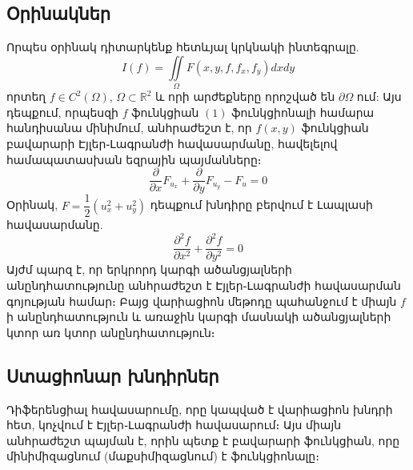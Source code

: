 \documentclass[fleqn, bachelor,subf,12pt,notitlepage]{article}
\begin{document}
\subsection*{Օրինակներ}
\hspace{\parindent}Որպես օրինակ դիտարկենք հետևյալ կրկնակի ինտեգրալը.
\begin{equation}
I\left(f\right)=\iint \limits_{\Omega} F\left(x, y, f, f_{x}, f_{y}\right)dxdy
\end{equation}
որտեղ $f \in C^{2}(\Omega)$,  $\Omega\subset \mathbb{R}^{2}$ և որի արժեքները որոշված են $\partial \Omega$ ում:
Այս դեպքում, որպեսզի $f$ ֆունկցիան $\left(1\right)$ ֆունկցիոնալի համարա հանդիսանա մինիմում, անհրաժեշտ է, որ $f(x,y)$ ֆունկցիան բավարարի Էյլեր֊Լագրանժի հավասարմանը, հավելելով համապատասխան եզրային պայմանները։
\begin{equation}
\dfrac{\partial}{\partial x}F_{u_{x}} + \dfrac{\partial}{\partial y}F_{u_{y}} - F_{u} = 0
\end{equation}
Օրինակ, $F = \dfrac{1}{2}\left(u_{x}^2+u_{y}^2\right)$ դեպքում խնդիրը բերվում է Լապլասի հավասարմանը.
\begin{equation}
\dfrac{\partial^{2}f}{\partial x^{2}} + \dfrac{\partial^{2}f}{\partial y^{2}} = 0
\end{equation}
Այժմ պարզ է, որ երկրորդ կարգի ածանցյալների անընդհատությունը անհրաժեշտ է Էյլեր֊Լագրանժի հավասարման գոյության համար։ Բայց վարիացիոն մեթոդը պահանջում է միայն $f$ ի անընդհատություն և առաջին կարգի մասնակի ածանցյալների կտոր առ կտոր անընդհատություն։
\subsection*{Ստացիոնար խնդիրներ}
Դիֆերենցիալ հավասարումը, որը կապված է վարիացիոն խնդրի հետ, կոչվում է Էյլեր֊Լագրանժի հավասարում։ Այս միայն անհրաժեշտ պայման է, որին պետք է բավարարի ֆունկցիան, որը մինիմիզացնում (մաքսիմիզացնում) է ֆունկցիոնալը։
\end{document}
